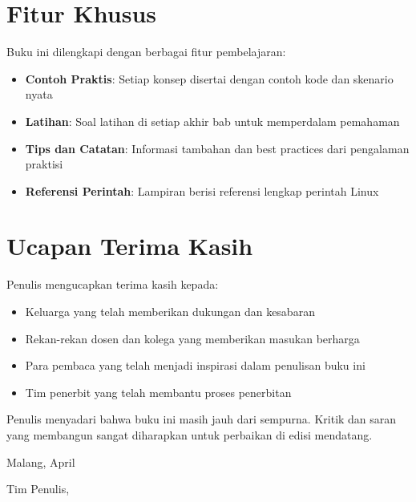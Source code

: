 \section*{Fitur Khusus}

Buku ini dilengkapi dengan berbagai fitur pembelajaran:

\begin{itemize}
    \item \textbf{Contoh Praktis}: Setiap konsep disertai dengan contoh kode dan
          skenario nyata
    \item \textbf{Latihan}: Soal latihan di setiap akhir bab untuk memperdalam
          pemahaman
    \item \textbf{Tips dan Catatan}: Informasi tambahan dan best practices dari
          pengalaman praktisi
    \item \textbf{Referensi Perintah}: Lampiran berisi referensi lengkap perintah Linux
\end{itemize}

\section*{Ucapan Terima Kasih}

Penulis mengucapkan terima kasih kepada:

\begin{itemize}
    \item Keluarga yang telah memberikan dukungan dan kesabaran
    \item Rekan-rekan dosen dan kolega yang memberikan masukan berharga
    \item Para pembaca yang telah menjadi inspirasi dalam penulisan buku ini
    \item Tim penerbit yang telah membantu proses penerbitan
\end{itemize}

Penulis menyadari bahwa buku ini masih jauh dari sempurna. Kritik dan saran yang
membangun sangat diharapkan untuk perbaikan di edisi mendatang.

\vspace{1cm}

\noindent
Malang, April \the\year

\vspace{1cm}

\noindent
Tim Penulis,

\vspace{2cm}

\cleardoublepage
